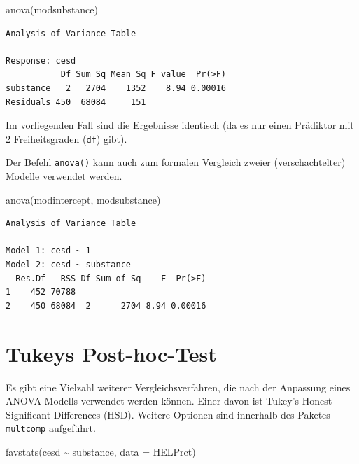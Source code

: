 \documentclass[
  ngerman,
]{scrbook}
\newenvironment{Shaded}{\begin{snugshade}}{\end{snugshade}}
\newcommand{\AttributeTok}[1]{\textcolor[rgb]{0.77,0.63,0.00}{#1}}
\newcommand{\FunctionTok}[1]{\textcolor[rgb]{0.00,0.00,0.00}{#1}}
\newcommand{\NormalTok}[1]{#1}
\newcommand{\SpecialCharTok}[1]{\textcolor[rgb]{0.00,0.00,0.00}{#1}}
\begin{document}
\begin{Shaded}
\begin{Highlighting}[]
\FunctionTok{anova}\NormalTok{(modsubstance)}
\end{Highlighting}
\end{Shaded}

\begin{verbatim}
Analysis of Variance Table

Response: cesd
           Df Sum Sq Mean Sq F value  Pr(>F)
substance   2   2704    1352    8.94 0.00016
Residuals 450  68084     151                
\end{verbatim}

Im vorliegenden Fall sind die Ergebnisse identisch (da es nur einen Prädiktor mit 2 Freiheitsgraden (\texttt{df}) gibt).

Der Befehl \texttt{anova()} kann auch zum formalen Vergleich zweier (verschachtelter) Modelle verwendet werden.

\begin{Shaded}
\begin{Highlighting}[]
\FunctionTok{anova}\NormalTok{(modintercept, modsubstance)}
\end{Highlighting}
\end{Shaded}

\begin{verbatim}
Analysis of Variance Table

Model 1: cesd ~ 1
Model 2: cesd ~ substance
  Res.Df   RSS Df Sum of Sq    F  Pr(>F)
1    452 70788                          
2    450 68084  2      2704 8.94 0.00016
\end{verbatim}

\hypertarget{tukeys-post-hoc-test}{%
\section{Tukeys Post-hoc-Test}\label{tukeys-post-hoc-test}}

Es gibt eine Vielzahl weiterer Vergleichsverfahren, die nach der Anpassung eines ANOVA-Modells verwendet werden können. Einer davon ist Tukey's Honest Significant Differences (HSD). Weitere Optionen sind innerhalb des Paketes \texttt{multcomp} aufgeführt.

\begin{Shaded}
\begin{Highlighting}[]
\FunctionTok{favstats}\NormalTok{(cesd }\SpecialCharTok{\textasciitilde{}}\NormalTok{ substance, }\AttributeTok{data =}\NormalTok{ HELPrct)}
\end{Highlighting}
\end{Shaded}
\end{document}
